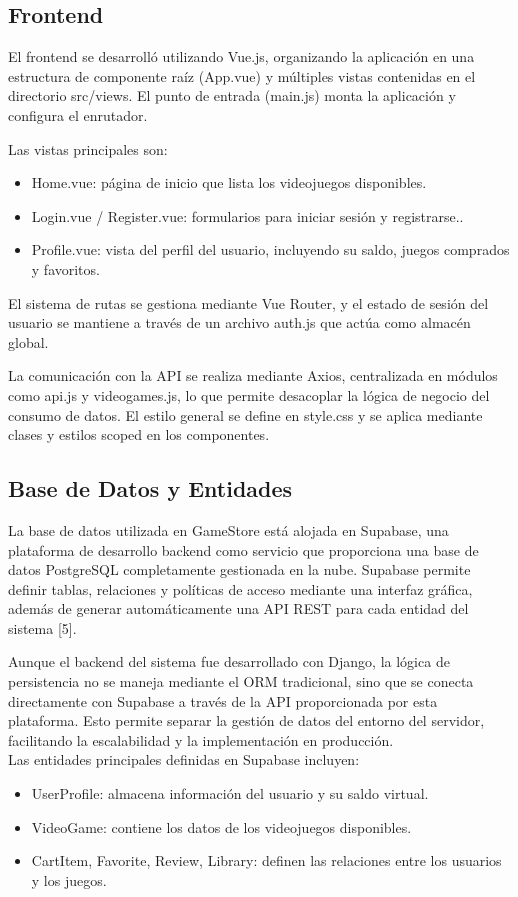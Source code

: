 \documentclass[conference]{IEEEtran}
\begin{document}
\subsection{Frontend}
El frontend se desarrolló utilizando Vue.js, organizando la aplicación en una estructura de componente raíz (App.vue) y múltiples vistas contenidas en el directorio src/views. El punto de entrada (main.js) monta la aplicación y configura el enrutador.

Las vistas principales son:
\begin{itemize}
	\item Home.vue: página de inicio que lista los videojuegos disponibles.
	\item Login.vue / Register.vue: formularios para iniciar sesión y registrarse..
	\item Profile.vue: vista del perfil del usuario, incluyendo su saldo, juegos comprados y favoritos.
\end{itemize}

El sistema de rutas se gestiona mediante Vue Router, y el estado de sesión del usuario se mantiene a través de un archivo auth.js que actúa como almacén global.

La comunicación con la API se realiza mediante Axios, centralizada en módulos como api.js y videogames.js, lo que permite desacoplar la lógica de negocio del consumo de datos. El estilo general se define en style.css y se aplica mediante clases y estilos scoped en los componentes.
\subsection{Base de Datos y Entidades}
La base de datos utilizada en GameStore está alojada en Supabase, una plataforma de desarrollo backend como servicio que proporciona una base de datos PostgreSQL completamente gestionada en la nube. Supabase permite definir tablas, relaciones y políticas de acceso mediante una interfaz gráfica, además de generar automáticamente una API REST para cada entidad del sistema [5].

Aunque el backend del sistema fue desarrollado con Django, la lógica de persistencia no se maneja mediante el ORM tradicional, sino que se conecta directamente con Supabase a través de la API proporcionada por esta plataforma. Esto permite separar la gestión de datos del entorno del servidor, facilitando la escalabilidad y la implementación en producción.	\\

Las entidades principales definidas en Supabase incluyen:
\begin{itemize}
	\item UserProfile: almacena información del usuario y su saldo virtual.
	\item VideoGame: contiene los datos de los videojuegos disponibles.
	\item CartItem, Favorite, Review, Library: definen las relaciones entre los usuarios y los juegos.
\end{itemize}
\end{document}
